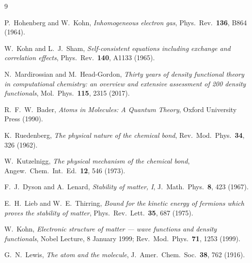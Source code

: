 \documentclass[11pt]{article}
\begin{document}
\begin{thebibliography}{9}

P.~Hohenberg and W.~Kohn,
\emph{Inhomogeneous electron gas},
Phys.\ Rev.\ \textbf{136}, B864 (1964).

W.~Kohn and L.~J.~Sham,
\emph{Self-consistent equations including exchange and correlation effects},
Phys.\ Rev.\ \textbf{140}, A1133 (1965).

N.~Mardirossian and M.~Head-Gordon,
\emph{Thirty years of density functional theory in computational chemistry: an overview and extensive assessment of 200 density functionals},
Mol.\ Phys.\ \textbf{115}, 2315 (2017).

R.~F.~W.~Bader,
\emph{Atoms in Molecules: A Quantum Theory},
Oxford University Press (1990).

K.~Ruedenberg,
\emph{The physical nature of the chemical bond},
Rev.\ Mod.\ Phys.\ \textbf{34}, 326 (1962).

W.~Kutzelnigg,
\emph{The physical mechanism of the chemical bond},
Angew.\ Chem.\ Int.\ Ed.\ \textbf{12}, 546 (1973).

F.~J.~Dyson and A.~Lenard,
\emph{Stability of matter, I},
J.\ Math.\ Phys.\ \textbf{8}, 423 (1967).

E.~H.~Lieb and W.~E.~Thirring,
\emph{Bound for the kinetic energy of fermions which proves the stability of matter},
Phys.\ Rev.\ Lett.\ \textbf{35}, 687 (1975).

W.~Kohn,
\emph{Electronic structure of matter --- wave functions and density functionals},
Nobel Lecture, 8 January 1999;
Rev.\ Mod.\ Phys.\ \textbf{71}, 1253 (1999).

G.~N.~Lewis,
\emph{The atom and the molecule},
J.\ Amer.\ Chem.\ Soc.\ \textbf{38}, 762 (1916).

\end{thebibliography}
\end{document}

